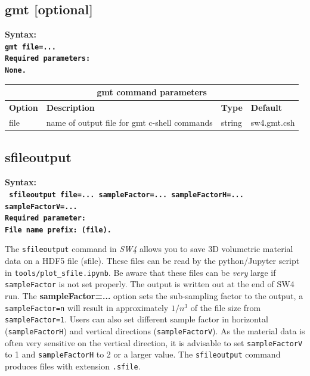\documentclass[11pt]{report}
\begin{document}
{%
\subsection{gmt [optional]}
\label{keyword:gmt}
\begin{flushleft}\bf
	Syntax:\\
	\tt gmt file=...\\
	\bf Required parameters:\\
	\rm None.
\end{flushleft}
%
\begin{center}
	\begin{tabular}{|l|p{8cm}|l|l|} \hline
		\multicolumn{4}{|c|}{\bf gmt command parameters}                                      \\ \hline
		\bf{Option} & \bf{Description}                             & \bf{Type} & \bf{Default} \\ \hline \hline
		file        & name of output file for gmt c-shell commands & string    & sw4.gmt.csh  \\ \hline
	\end{tabular}
\end{center}


\subsection{sfileoutput}
\label{keyword:sfileoutput}

\begin{flushleft}
	\bf Syntax:\\ \tt
	sfileoutput file=... sampleFactor=...  sampleFactorH=... sampleFactorV=...  \\
	\bf Required parameter:\\
	\rm File name prefix: (file).
\end{flushleft}
%
The \verb+sfileoutput+ command in \emph{SW4} allows you to save 3D volumetric material data on a HDF5 file (sfile). These files
can be read by the python/Jupyter script in \verb+tools/plot_sfile.ipynb+.
Be aware that these files can be {\em very} large if \verb+sampleFactor+ is not set properly.
The output is written out at the end of SW4 run. The {\bf sampleFactor=...} option sets the sub-sampling factor to the output, a \verb+sampleFactor=n+ will result in approximately $1/n^3$ of the file size from \verb+sampleFactor=1+.
Users can also set different sample factor in horizontal (\verb+sampleFactorH+) and vertical directions (\verb+sampleFactorV+). As the material data is often very sensitive on the vertical direction, it is advisable to set \verb+sampleFactorV+ to 1 and \verb+sampleFactorH+ to 2 or a larger value.
The \verb+sfileoutput+ command produces files with extension \verb+.sfile+.

}
\end{document}
